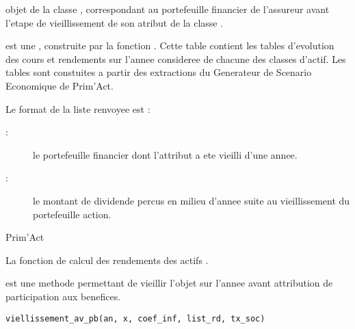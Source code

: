 \documentclass[a4paper]{book}
\begin{document}
%
\begin{Arguments}
\begin{ldescription}
\item[\code{x}] objet de la classe , correspondant au portefeuille financier de l'assureur avant l'etape de vieillissement de son atribut  de la classe .

\item[\code{table\_rdt}] est une , construite par la fonction .
Cette table contient les tables d'evolution des cours et rendements sur l'annee consideree de chacune des classes d'actif.
Les tables sont constuites a partir des extractions du Generateur de Scenario Economique de Prim'Act.
\end{ldescription}
\end{Arguments}
%
\begin{Value}
Le format de la liste renvoyee est :
\begin{description}

\item[ : ] le portefeuille financier dont l'attribut  a ete vieilli d'une annee.
\item[ : ] le montant de dividende percus en milieu d'annee suite au vieillissement du portefeuille action.

\end{description}

\end{Value}
%
\begin{Author}\relax
Prim'Act
\end{Author}
%
\begin{SeeAlso}\relax
La fonction de calcul des rendements des actifs .
\end{SeeAlso}
%
\begin{Description}\relax
{} est une methode permettant de vieillir l'objet 
sur l'annee avant attribution de participation aux benefices.
\end{Description}
%
\begin{Usage}
\begin{verbatim}
viellissement_av_pb(an, x, coef_inf, list_rd, tx_soc)
\end{verbatim}
\end{Usage}
\end{document}
